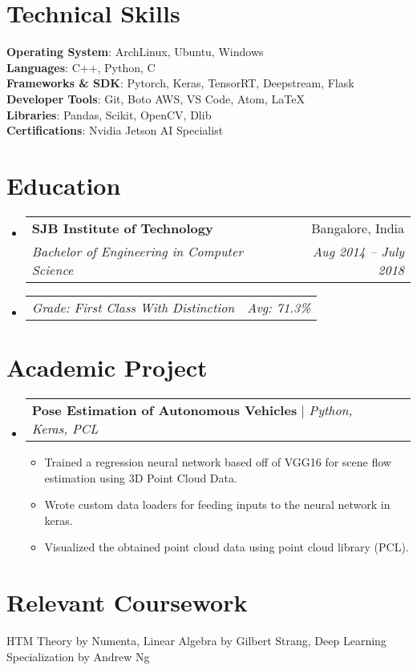 \documentclass[letterpaper,11pt]{article}
\makeatletter
\newcommand{\resumeItem}[1]{
  \item\small{
    {#1 \vspace{-2pt}}
  }
}
\newcommand{\resumeSubheading}[4]{
  \vspace{-2pt}\item
    \begin{tabular*}{0.97\textwidth}[t]{l@{\extracolsep{\fill}}r}
      \textbf{#1} & #2 \\
      \textit{\small#3} & \textit{\small #4} \\
    \end{tabular*}\vspace{-7pt}
}
\newcommand{\resumeSubSubheading}[2]{
    \item
    \begin{tabular*}{0.97\textwidth}{l@{\extracolsep{\fill}}r}
      \textit{\small#1} & \textit{\small #2} \\
    \end{tabular*}\vspace{-7pt}
}
\newcommand{\resumeProjectHeading}[2]{
    \item
    \begin{tabular*}{0.97\textwidth}{l@{\extracolsep{\fill}}r}
      \small#1 & #2 \\
    \end{tabular*}\vspace{-7pt}
}
\newcommand{\resumeSubHeadingListStart}{\begin{itemize}[leftmargin=0.15in, label={}]}
\newcommand{\resumeSubHeadingListEnd}{\end{itemize}}
\newcommand{\resumeItemListStart}{\begin{itemize}}
\newcommand{\resumeItemListEnd}{\end{itemize}\vspace{-5pt}}
\makeatother
\begin{document}
\section{Technical Skills}
\begin{itemize}[leftmargin=0.15in, label={}]
   \small{\item{
    \textbf{Operating System}{: ArchLinux, Ubuntu, Windows} \\
    \textbf{Languages}{: C++, Python, C} \\
    \textbf{Frameworks \& SDK}{: Pytorch, Keras, TensorRT, Deepstream, Flask} \\
    \textbf{Developer Tools}{: Git, Boto AWS, VS Code, Atom, LaTeX} \\
    \textbf{Libraries}{: Pandas, Scikit, OpenCV, Dlib} \\
    \textbf{Certifications}{: Nvidia Jetson AI Specialist}
   }}
\end{itemize}


\section{Education}
\resumeSubHeadingListStart
  \resumeSubheading
    {SJB Institute of Technology}{Bangalore, India}
    {Bachelor of Engineering in Computer Science}{Aug 2014 -- July 2018}
    \resumeSubSubheading
      {Grade: First Class With Distinction}{Avg: 71.3\%}
\resumeSubHeadingListEnd


\section{Academic Project}
    \resumeSubHeadingListStart
      \resumeProjectHeading
          {\textbf{Pose Estimation of Autonomous Vehicles} $|$ \emph{Python, Keras, PCL}}{}
          \resumeItemListStart
            \resumeItem{Trained a regression neural network based off of VGG16 for scene flow estimation using 3D Point Cloud Data.}
            \resumeItem{Wrote custom data loaders for feeding inputs to the neural network in keras.}
            \resumeItem{Visualized the obtained point cloud data using point cloud library (PCL).}
          \resumeItemListEnd
    \resumeSubHeadingListEnd


\section{Relevant Coursework}
\begin{itemize}[leftmargin=0.15in, label={}]
  \small{\item{
   HTM Theory by Numenta, Linear Algebra by Gilbert Strang, Deep Learning Specialization by Andrew Ng
  }}
\end{itemize}
  

%
\end{document}
